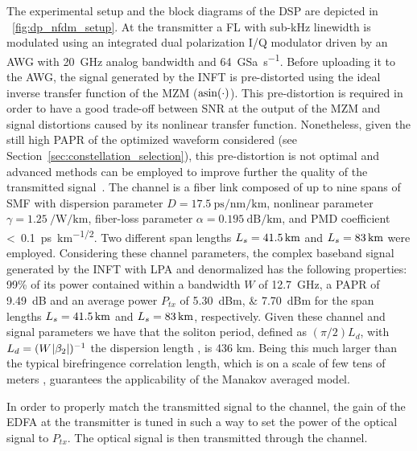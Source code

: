 The experimental setup and the block diagrams of the \ac{DSP} are depicted  in \figurename~\ref{fig:dp_nfdm_setup}.
At the
transmitter a \ac{FL} with sub-kHz
linewidth is modulated using an integrated dual polarization \ac{I}/\ac{Q}
modulator driven by an \ac{AWG} with \SI{20}{\GHz} analog
bandwidth and \SI{64}{GSa\per\s}. Before uploading it to the \ac{AWG}, the signal
generated by the \ac{INFT} is pre-distorted using the ideal inverse
transfer function of the \ac{MZM} ($\asin(\cdot)$). This pre-distortion is
required in order to have a good trade-off between \ac{SNR} at the output of
the \ac{MZM} and signal distortions caused by its nonlinear transfer function. Nonetheless, given the still high \ac{PAPR} of the optimized waveform considered (see Section~\ref{sec:constellation_selection}), this
pre-distortion is not optimal and advanced methods can be employed to
improve further the quality of the transmitted signal~\cite{Le2017}.
The channel is a fiber link composed of
up to nine spans of \ac{SMF} with dispersion parameter \mbox{$D =
\SI{17.5}{\ps\per\nm\per\km}$}, nonlinear parameter \mbox{$\gamma = \SI[per-mode=reciprocal]{1.25}{\per\watt\per\km}$}, fiber-loss parameter \mbox{$\alpha = \SI{0.195}{\dB\per\km}$}, and \ac{PMD} coefficient <~\SI{0.1}{\ps~\km^{-1/2}}.
Two different span lengths $\spanl=\SI{41.5}{\km}$ and $\spanl=\SI{83}{\km}$ were employed.
Considering these channel parameters, the complex baseband signal generated by the \ac{INFT} with \ac{LPA} and denormalized has the following properties: 99\% of its power contained within a bandwidth $W$ of \SI{12.7}{\GHz}, a \ac{PAPR} of \SI{9.49}{\dB} and an average power $P_{tx}$ of \SIlist{5.30;7.70}{dBm} for the span lengths $\spanl=\SI{41.5}{\km}$ and $\spanl=\SI{83}{\km}$, respectively. Given these channel and signal parameters we have that the soliton period, defined as $(\pi/2) L_d$, with $L_d = (W^{}|\beta_2|)^{-1}$ the dispersion length \cite{hasegawa1995solitons,Turitsyn2017}, is 436 km. Being this  much larger than the typical birefringence correlation length, which is on a scale of few tens of meters \cite{menyuk2006interaction}, guarantees the applicability of the Manakov averaged model.

In order to properly match the transmitted signal to the channel, the gain of the \ac{EDFA} at the transmitter is tuned in such a way to set the power of the optical signal to $P_{tx}$.
The optical signal is then transmitted through the channel.

